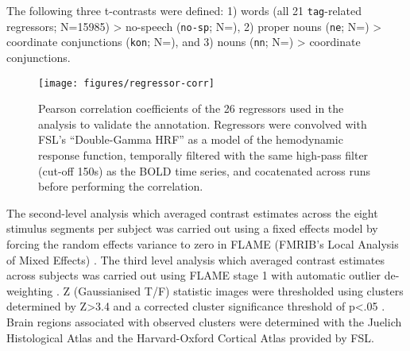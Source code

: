 \documentclass[10pt,a4paper,onecolumn]{article}
\begin{document}
The following three t-contrasts were defined:
1) words (all 21 \texttt{tag}-related regressors; N=15985) > no-speech (\texttt{no-sp}; N=\rNospAll),
2) proper nouns (\texttt{ne}; N=\rNeAll) > coordinate conjunctions (\texttt{kon}; N=\rKonAll), and
3) nouns (\texttt{nn}; N=\rNeAll) > coordinate conjunctions.

\begin{figure*}
  \centering
  \texttt{[image: figures/regressor-corr]}
  \caption{Pearson correlation coefficients of the 26 regressors used in the analysis to validate the annotation.
Regressors were convolved with FSL's ``Double-Gamma HRF'' as a model of the hemodynamic response function, temporally filtered with the same high-pass filter (cut-off 150s) as the BOLD time series, and cocatenated across runs before performing the correlation.}
\label{fig:reg-corr}
\end{figure*}


The second-level analysis which averaged contrast estimates across the eight stimulus segments per subject was carried out using a fixed effects model by forcing the random effects variance to zero in FLAME (FMRIB's Local Analysis of Mixed Effects) \citep{beckmann2003general, woolrich2004multilevel}.
The third level analysis which averaged contrast estimates across subjects was carried out using FLAME stage 1 with automatic outlier de-weighting \citep{woolrich2004multilevel, woolrich2008robust}.
Z (Gaussianised T/F) statistic images were thresholded using clusters determined by Z>3.4 and a corrected cluster significance threshold of p<.05 \citep{woolrich2008robust}.
Brain regions associated with observed clusters were determined with the Juelich Histological Atlas \citep{eickhoff2005toolbox,eickhoff2007assignment} and the Harvard-Oxford Cortical Atlas \citep{desikan2006automated} provided by FSL.
\end{document}

